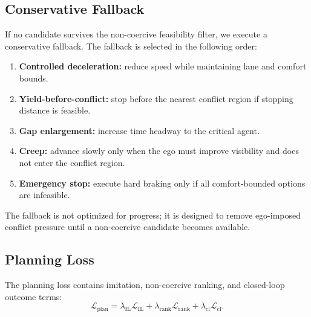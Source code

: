 \documentclass[10pt]{article}
\begin{document}
\subsection{Conservative Fallback}
\label{app:fallback}

If no candidate survives the non-coercive feasibility filter, we execute a conservative fallback. The fallback is selected in the following order:
\begin{enumerate}
    \item \textbf{Controlled deceleration:} reduce speed while maintaining lane and comfort bounds.
    \item \textbf{Yield-before-conflict:} stop before the nearest conflict region if stopping distance is feasible.
    \item \textbf{Gap enlargement:} increase time headway to the critical agent.
    \item \textbf{Creep:} advance slowly only when the ego must improve visibility and does not enter the conflict region.
    \item \textbf{Emergency stop:} execute hard braking only if all comfort-bounded options are infeasible.
\end{enumerate}
The fallback is not optimized for progress; it is designed to remove ego-imposed conflict pressure until a non-coercive candidate becomes available.

\subsection{Planning Loss}
\label{app:planning_loss}

The planning loss contains imitation, non-coercive ranking, and closed-loop outcome terms:
\begin{equation}
    \mathcal{L}_{\mathrm{plan}}
    =
    \lambda_{\mathrm{IL}}\mathcal{L}_{\mathrm{IL}}
    +
    \lambda_{\mathrm{rank}}\mathcal{L}_{\mathrm{rank}}
    +
    \lambda_{\mathrm{cl}}\mathcal{L}_{\mathrm{cl}}.
\end{equation}
\end{document}
